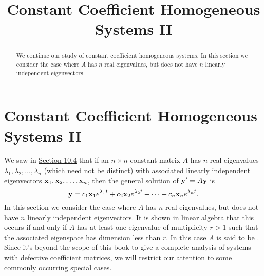 \documentclass{ximera}
\title{Constant Coefficient Homogeneous Systems II}%
\begin{document}
\begin{abstract}
We continue our study of constant coefficient homogeneous systems.  In this section we consider the case where $A$ has $n$ real
eigenvalues, but does not have $n$ linearly independent eigenvectors.
\end{abstract}

\maketitle

\section*{Constant Coefficient Homogeneous Systems II}

We saw in \href{https://xerxes.ximera.org/differentialequations/main/constCoeffHomSysI/constCoeffHomSysI}{Section 10.4} that if an $n\times n$
constant matrix
$A$ has $n$ real eigenvalues $\lambda_1, \lambda_2, \dots, \lambda_n$
(which need not be distinct) with associated linearly independent
eigenvectors ${\bf x}_1, {\bf x}_2, \dots, {\bf x}_n$, then the general
solution of ${\bf y}'=A{\bf y}$ is
$$
{\bf y}=c_1{\bf x}_1e^{\lambda_1t}+c_2{\bf x}_2e^{\lambda_2 t}
+\cdots+c_n{\bf x}_ne^{\lambda_n t}.
$$
In this section we consider the case where $A$ has $n$ real
eigenvalues, but does not have $n$ linearly independent eigenvectors.
It is shown in linear algebra that this occurs if and only if $A$ has
at least one eigenvalue of multiplicity $r>1$ such that the associated
eigenspace has dimension less than $r$. In this case $A$ is said to be
. Since it's beyond the scope of this book to give a
complete analysis of systems with defective coefficient matrices, we
will restrict our attention to some commonly occurring special cases.
\end{document}
